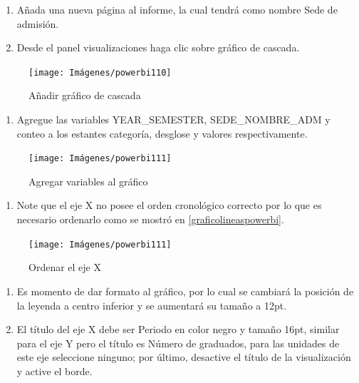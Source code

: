 \documentclass[
]{book}
\providecommand{\tightlist}{%
  \setlength{\itemsep}{0pt}\setlength{\parskip}{0pt}}
\begin{document}
\begin{enumerate}
\def\labelenumi{\arabic{enumi}.}
\item
  Añada una nueva página al informe, la cual tendrá como nombre Sede de admisión.
\item
  Desde el panel visualizaciones haga clic sobre gráfico de cascada.
\end{enumerate}

\begin{figure}

{\centering \texttt{[image: Imágenes/powerbi110]} 

}

\caption{Añadir gráfico de cascada}\label{fig:paso2cascada-fig}
\end{figure}

\begin{enumerate}
\def\labelenumi{\arabic{enumi}.}
\setcounter{enumi}{2}
\tightlist
\item
  Agregue las variables YEAR\_SEMESTER, SEDE\_NOMBRE\_ADM y conteo a los estantes categoría, desglose y valores respectivamente.
\end{enumerate}

\begin{figure}

{\centering \texttt{[image: Imágenes/powerbi111]} 

}

\caption{Agregar variables al gráfico}\label{fig:paso3cascada-fig}
\end{figure}

\begin{enumerate}
\def\labelenumi{\arabic{enumi}.}
\setcounter{enumi}{3}
\tightlist
\item
  Note que el eje X no posee el orden cronológico correcto por lo que es necesario ordenarlo como se mostró en \ref{graficolineaspowerbi}.
\end{enumerate}

\begin{figure}

{\centering \texttt{[image: Imágenes/powerbi111]} 

}

\caption{Ordenar el eje X}\label{fig:paso4cascada-fig}
\end{figure}

\begin{enumerate}
\def\labelenumi{\arabic{enumi}.}
\setcounter{enumi}{4}
\item
  Es momento de dar formato al gráfico, por lo cual se cambiará la posición de la leyenda a centro inferior y se aumentará su tamaño a 12pt.
\item
  El título del eje X debe ser Periodo en color negro y tamaño 16pt, similar para el eje Y pero el título es Número de graduados, para las unidades de este eje seleccione ninguno; por último, desactive el título de la visualización y active el borde.
\end{enumerate}
\end{document}
